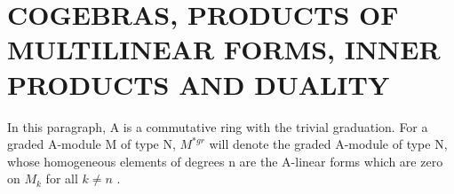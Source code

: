 \section{COGEBRAS, PRODUCTS OF MULTILINEAR FORMS, INNER PRODUCTS AND DUALITY}

In this paragraph, A is a commutative ring with the trivial graduation. For a graded A-module M of type N, \(M^{*gr}\) will denote the graded A-module of type N, whose homogeneous elements of degrees n are the A-linear forms which are zero on \(M_{k}\) for all \(k \neq n\) .

